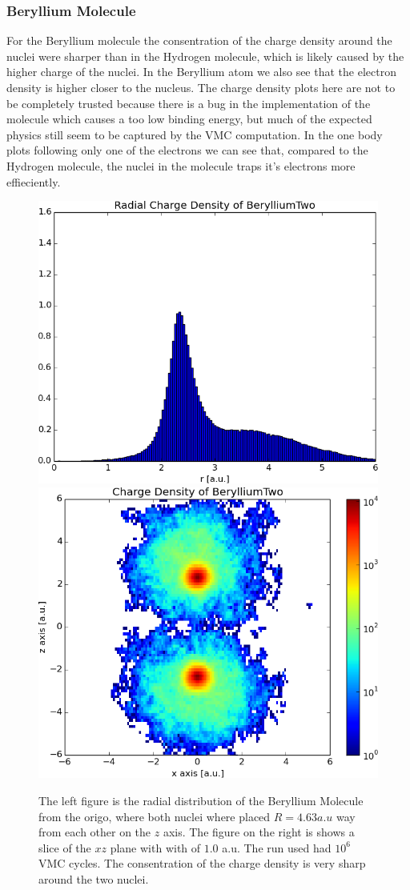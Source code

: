 	\subsubsection{Beryllium Molecule}

		For the Beryllium molecule the consentration of the charge density around the nuclei were sharper than in the Hydrogen molecule, which is likely caused by the higher charge of the nuclei. In the Beryllium atom we also see that the electron density is higher closer to the nucleus. The charge density plots here are not to be completely trusted because there is a bug in the implementation of the molecule which causes a too low binding energy, but much of the expected physics still seem to be captured by the VMC computation. In the one body plots following only one of the electrons we can see that, compared to the Hydrogen molecule, the nuclei in the molecule traps it's electrons more effieciently.
		
		\begin{figure}
			\centering \includegraphics[width=0.45\linewidth]{../figures/used/ChargeDensityBerylliumTwo}
			\centering \includegraphics[width=0.45\linewidth]{../figures/used/OneBodyDensityBerylliumTwo}
			\protect\caption{The left figure is the radial distribution of the Beryllium Molecule from the origo, where both nuclei where placed \(R = 4.63 a.u\) way from each other on the \(z\) axis. The figure on the right is shows a slice of the \(xz\) plane with with of \(1.0\) a.u. The run used had $10^6$ VMC cycles. The consentration of the charge density is very sharp around the two nuclei.}
			\label{fig:chargeDensityBerylliumTwo}
		\end{figure}
